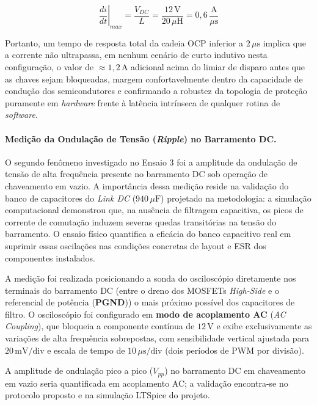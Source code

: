 \begin{equation}
    \left.\frac{di}{dt}\right|_{max} = \frac{V_{DC}}{L} = \frac{12\,\text{V}}{20\,\mu\text{H}} = 0{,}6\,\frac{\text{A}}{\mu\text{s}}
\end{equation}

Portanto, um tempo de resposta total da cadeia OCP inferior a $2\,\mu\text{s}$ implica que a corrente não ultrapassa, em nenhum cenário de curto indutivo nesta configuração, o valor de $\approx 1{,}2\,\text{A}$ adicional acima do limiar de disparo antes que as chaves sejam bloqueadas, margem confortavelmente dentro da capacidade de condução dos semicondutores e confirmando a robustez da topologia de proteção puramente em \textit{hardware} frente à latência intrínseca de qualquer rotina de \textit{software}.

\paragraph{Medição da Ondulação de Tensão (\textit{Ripple}) no Barramento DC.}

O segundo fenômeno investigado no Ensaio 3 foi a amplitude da ondulação de tensão de alta frequência presente no barramento DC sob operação de chaveamento em vazio. A importância dessa medição reside na validação do banco de capacitores do \textit{Link DC} ($940\,\mu\text{F}$) projetado na metodologia: a simulação computacional demonstrou que, na ausência de filtragem capacitiva, os picos de corrente de comutação induzem severas quedas transitórias na tensão do barramento. O ensaio físico quantifica a eficácia do banco capacitivo real em suprimir essas oscilações nas condições concretas de layout e ESR dos componentes instalados.

A medição foi realizada posicionando a sonda do osciloscópio diretamente nos terminais do barramento DC (entre o dreno dos MOSFETs \textit{High-Side} e o referencial de potência (\textbf{PGND})) o mais próximo possível dos capacitores de filtro. O osciloscópio foi configurado em \textbf{modo de acoplamento AC} (\textit{AC Coupling}), que bloqueia a componente contínua de $12\,\text{V}$ e exibe exclusivamente as variações de alta frequência sobrepostas, com sensibilidade vertical ajustada para $20\,\text{mV/div}$ e escala de tempo de $10\,\mu\text{s/div}$ (dois períodos de PWM por divisão).

A amplitude de ondulação pico a pico ($V_{pp}$) no barramento DC em chaveamento em vazio seria quantificada em acoplamento AC; a validação encontra-se no protocolo proposto e na simulação LTSpice do projeto.

